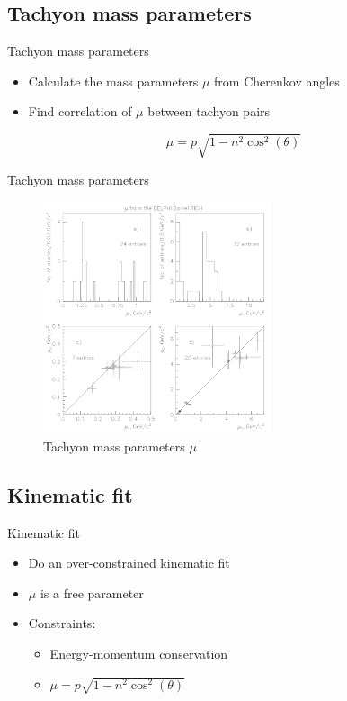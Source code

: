 \documentclass{beamer}
\begin{document}
\subsection{Tachyon mass parameters}
\begin{frame}{Tachyon mass parameters}
  \begin{itemize}
    \item{Calculate the mass parameters $\mu$ from Cherenkov angles}
    \item{Find correlation of $\mu$ between tachyon pairs}
  \end{itemize}
  \vspace{1cm}
  \begin{equation*}
    \mu = p\sqrt{1 - n^2\cos^2(\theta)}
  \end{equation*}
\end{frame}

\begin{frame}{Tachyon mass parameters}
  \begin{figure}
    \centering
    \includegraphics[width = 0.6\textwidth]{MassParameters.png}
    \caption{Tachyon mass parameters $\mu$}
  \end{figure}
\end{frame}

\subsection{Kinematic fit}
\begin{frame}{Kinematic fit}
  \begin{itemize}
    \item{Do an over-constrained kinematic fit}
    \item{$\mu$ is a free parameter}
    \item{Constraints:}
    \begin{itemize}
      \item{Energy-momentum conservation}
      \item{$\mu = p\sqrt{1 - n^2\cos^2(\theta)}$}
    \end{itemize}
  \end{itemize}
\end{frame}
\end{document}
